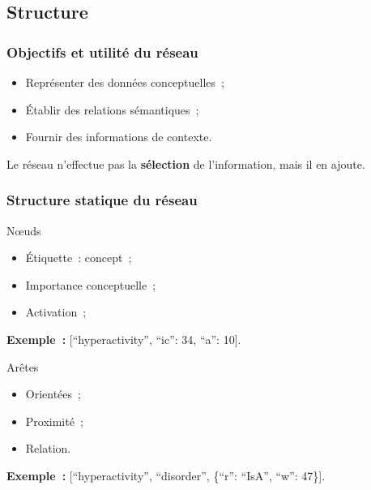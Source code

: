 \documentclass[12pt, handout]{beamer}
\begin{document}
\subsection{Structure}

\begin{frame}
 \frametitle{Objectifs et utilité du réseau}
 
 \begin{itemize}
  \item Représenter des données conceptuelles~;
  \item Établir des relations sémantiques~;
  \item Fournir des informations de contexte.
 \end{itemize}
 
 Le réseau n'effectue pas la \textbf{sélection} de l'information, mais il en ajoute.
 
\end{frame}


\begin{frame}[allowframebreaks = 0.7, fragile]
 \frametitle{Structure statique du réseau}
 
 \begin{block}{N\oe{}uds}
\begin{itemize}
 \item Étiquette~: concept~;
 \item Importance conceptuelle~;
 \item Activation~;
\end{itemize}

\textbf{Exemple~:} [``hyperactivity'', ``ic'': 34, ``a'': 10].

\end{block}
 
\begin{block}{Arêtes}
 \begin{itemize}
  \item Orientées~;
  \item Proximité~;
  \item Relation.
 \end{itemize}

\textbf{Exemple~:} [``hyperactivity'', ``disorder'', \{``r'': ``IsA'', ``w'': 47\}].
 
\end{block}

 
\end{frame}
\end{document}
